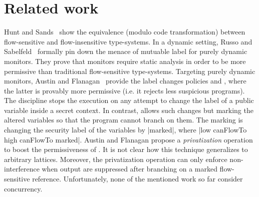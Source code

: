 \section{Related work}

Hunt and Sands~\citep{Hunt:2006} show the equivalence (modulo code
transformation) between flow-sensitive and flow-insensitive type-systems. In a
dynamic setting, Russo and Sabelfeld~\citep{Russo:2010} formally pin down the
menace of mutuable label for purely dynamic monitors. They prove that monitors
require static analysis in order to be more permissive than traditional
flow-sensitive type-systems. Targeting purely dynamic monitors, Austin and
Flanagan~\citep{Austin:Flanagan:PLAS10} provide the label changes policies
\emph{\nsu} and \emph{\pu}, where the latter is provably more permissive
(i.e. it rejects less suspicious programs). The discipline {\nsu} stops the
execution on any attempt to change the label of a public variable inside a
secret context. In contrast, {\pu} allows such changes but marking the altered
variables so that the program cannot branch on them. The marking is changing the
security label of the variables by |marked|, where |low canFlowTo high canFlowTo
marked|.  Austin and Flanagan propose a \emph{privatization} operation to boost
the permissiveness of {\pu}.  It is not clear how this technique generalizes to
arbitrary lattices. Moreover, the privatization operation can only enforce
non-interference when output are suppressed after branching on a marked
flow-sensitive reference. Unfortunately, none of the mentioned work so far
consider concurrency.

